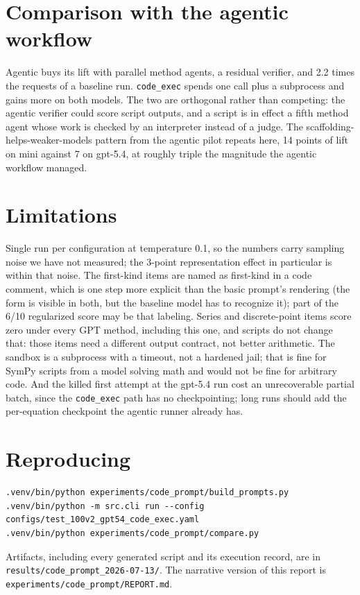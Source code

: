 \documentclass[11pt]{article}
\begin{document}
\section{Comparison with the agentic workflow}
Agentic buys its lift with parallel method agents, a residual verifier, and
2.2 times the requests of a baseline run. \texttt{code\_exec} spends one call
plus a subprocess and gains more on both models. The two are orthogonal
rather than competing: the agentic verifier could score script outputs, and a
script is in effect a fifth method agent whose work is checked by an
interpreter instead of a judge. The scaffolding-helps-weaker-models pattern
from the agentic pilot repeats here, 14 points of lift on mini against 7 on
gpt-5.4, at roughly triple the magnitude the agentic workflow managed.

\section{Limitations}
Single run per configuration at temperature 0.1, so the numbers carry
sampling noise we have not measured; the 3-point representation effect in
particular is within that noise. The first-kind items are named as first-kind
in a code comment, which is one step more explicit than the basic prompt's
rendering (the form is visible in both, but the baseline model has to
recognize it); part of the 6/10 regularized score may be that labeling.
Series and discrete-point items score zero under every GPT method, including
this one, and scripts do not change that: those items need a different output
contract, not better arithmetic. The sandbox is a subprocess with a timeout,
not a hardened jail; that is fine for SymPy scripts from a model solving math
and would not be fine for arbitrary code. And the killed first attempt at the
gpt-5.4 run cost an unrecoverable partial batch, since the
\texttt{code\_exec} path has no checkpointing; long runs should add the
per-equation checkpoint the agentic runner already has.

\section{Reproducing}
\begin{verbatim}
.venv/bin/python experiments/code_prompt/build_prompts.py
.venv/bin/python -m src.cli run --config configs/test_100v2_gpt54_code_exec.yaml
.venv/bin/python experiments/code_prompt/compare.py
\end{verbatim}
Artifacts, including every generated script and its execution record, are in
\texttt{results/code\_prompt\_2026-07-13/}. The narrative version of this
report is \texttt{experiments/code\_prompt/REPORT.md}.
\end{document}
